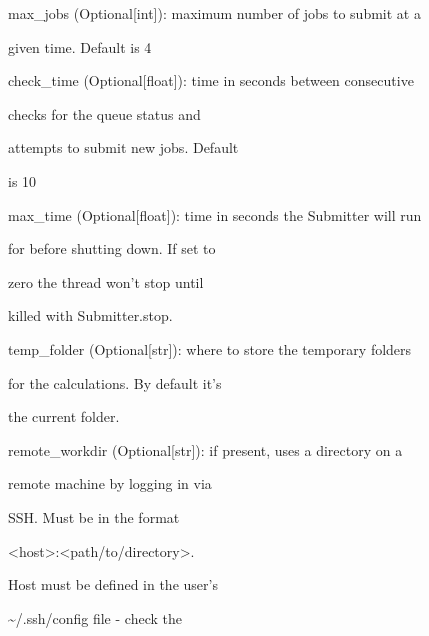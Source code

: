 \documentclass[letterpaper,10pt,english]{sphinxmanual}
\begin{document}
\begin{fulllineitems}
\begin{DUlineblock}{0em}
\begin{DUlineblock}{\DUlineblockindent}
\item[] max\_jobs (Optional{[}int{]}): maximum number of jobs to submit at a
\item[]
\begin{DUlineblock}{\DUlineblockindent}
\item[] given time. Default is 4
\end{DUlineblock}
\item[] check\_time (Optional{[}float{]}): time in seconds between consecutive
\item[]
\begin{DUlineblock}{\DUlineblockindent}
\item[] checks for the queue status and
\item[] attempts to submit new jobs. Default
\item[] is 10
\end{DUlineblock}
\item[] max\_time (Optional{[}float{]}): time in seconds the Submitter will run
\item[]
\begin{DUlineblock}{\DUlineblockindent}
\item[] for before shutting down. If set to
\item[] zero the thread won't stop until
\item[] killed with Submitter.stop.
\end{DUlineblock}
\item[] temp\_folder (Optional{[}str{]}): where to store the temporary folders
\item[]
\begin{DUlineblock}{\DUlineblockindent}
\item[] for the calculations. By default it's
\item[] the current folder.
\end{DUlineblock}
\item[] remote\_workdir (Optional{[}str{]}): if present, uses a directory on a
\item[]
\begin{DUlineblock}{\DUlineblockindent}
\item[] remote machine by logging in via
\item[] SSH. Must be in the format
\item[] \textless{}host\textgreater{}:\textless{}path/to/directory\textgreater{}.
\item[] Host must be defined in the user's
\item[] \textasciitilde{}/.ssh/config file - check the

\end{DUlineblock}
\end{DUlineblock}
\end{DUlineblock}
\end{fulllineitems}
\end{document}
